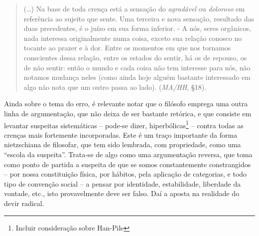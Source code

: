 \documentclass[
	12pt,				%
	openright,			%
	oneside,			%
	a4paper,			%
	english,			%
	french,				%
	spanish,			%
	brazil				%
	]{abntex2}
\begin{document}
\begin{quotation}
(…) Na base de toda crença está a sensação do \textit{agradável} ou \textit{doloroso} em referência ao sujeito que sente. Uma terceira e nova sensação, resultado das duas precedentes, é o juízo em sua forma inferior. - A nós, seres orgânicos, nada interessa originalmente numa coisa, exceto sua relação conosco no tocante ao prazer e à dor. Entre os momentos em que nos tornamos conscientes dessa relação, entre os estados do sentir, há os de repouso, os de não sentir: então o mundo e cada coisa não tem interesse para nós, não notamos mudança neles (como ainda hoje alguém bastante interessado em algo não nota que um outro passa ao lado). (\textit{MA/HH}, §18).
\end{quotation}

Ainda sobre o tema do erro, é relevante notar que o filósofo emprega uma outra linha de argumentação, que não deixa de ser bastante retórica, e que consiste em levantar suspeitas sistemáticas – pode-se dizer, hiperbólicas\footnote{Incluir consideração sobre Han-Pile} – contra todas as crenças mais fortemente incorporadas. Este é um traço importante da forma nietzschiana de filosofar, que tem sido lembrada, com propriedade, como uma “escola da suspeita”. Trata-se de algo como uma argumentação reversa, que toma como ponto de partida a suspeita de que se somos constantemente constrangidos – por nossa constituição física, por hábitos, pela aplicação de categorias, e todo tipo de convenção social – a pensar por identidade, estabilidade, liberdade da vontade, etc., isto provavelmente deve ser falso. Daí a aposta na realidade do devir radical.
\end{document}
